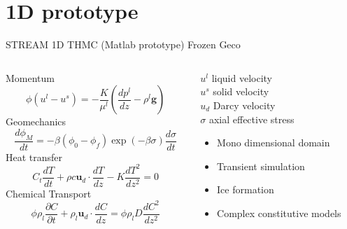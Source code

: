 \documentclass{beamer}
\begin{document}
\section{1D prototype}
\begin{frame}{STREAM 1D THMC (Matlab prototype) Frozen Geco}
\ 
\\  
\begin{columns}
\begin{column}{0.6\textwidth}
Momentum
\begin{equation*}
\phi(u^l-u^s)=-\frac{K}{\mu^l}\left(\frac{d p^l}{dz}  -\rho^l \mathbf{g}\right)
\end{equation*}
Geomechanics
\begin{equation*}
\frac{d\phi_M}{dt}=-\beta(\phi_0-\phi_f)\exp(-\beta\sigma)\frac{d\sigma}{dt}
\end{equation*}
Heat transfer
\begin{equation*}
C_t\frac{dT}{dt} + \rho c \mathbf{u}_d\cdot \frac{dT}{dz}  - K \frac{d T^2}{dz^2} =0
\end{equation*}
Chemical Transport
\begin{equation*}
\phi \rho_l \frac{\partial C}{\partial t} +  \rho_l \mathbf{u}_d\cdot
\frac{dC}{dz}  = \phi \rho_l D \frac{d C^2}{dz^2}
\end{equation*}
\end{column}
\begin{column}{0.5 \textwidth}
$u^l$ liquid velocity\\
$u^s$ solid velocity\\
$u_d$ Darcy velocity\\
$\sigma$ axial effective stress\\
\vspace{1cm}
 \begin{itemize}
  \item Mono dimensional domain
  \item Transient simulation
  \item Ice formation
  \item Complex constitutive models
 \end{itemize}
\end{column}
\end{columns}
\end{frame}
\end{document}
